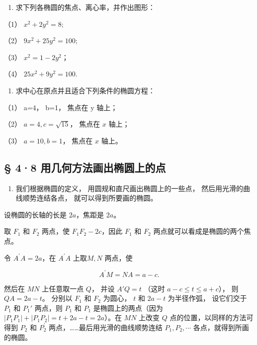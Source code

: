 \begin{enumerate}
\def\labelenumi{\arabic{enumi}.}
\tightlist
\item
  求下列各椭圆的焦点、离心率，并作出图形：
\end{enumerate}

（1） \(x^{2} + 2y^{2} = 8;\)

（2） \(9x^{2} + 25y^{2} = 100;\)

（3） \(x^{2} = 1 - 2y^{2}\)；

（4） \(25x^{2} + 9y^{2} = 100.\)

\begin{enumerate}
\def\labelenumi{\arabic{enumi}.}
\setcounter{enumi}{1}
\tightlist
\item
  求中心在原点并且适合下列条件的椭圆方程：
\end{enumerate}

（1） a=4， b=1， 焦点在 y 轴上；

（2） \(a = 4, c = \sqrt{15}\)， 焦点在 \(x\) 轴上；

（3） \(a = 10, b = 1\)， 焦点在 \(x\) 轴上。

\subsection{§ 4·8
用几何方法画出椭圆上的点}\label{ux7528ux51e0ux4f55ux65b9ux6cd5ux753bux51faux692dux5706ux4e0aux7684ux70b9}

\begin{enumerate}
\def\labelenumi{\arabic{enumi}.}
\tightlist
\item
  我们根据椭圆的定义， 用圆规和直尺画出椭圆上的一些点，
  然后用光滑的曲线顺势连结各点， 就可以得到所要画的椭圆。
\end{enumerate}

设椭圆的长轴的长是 \(2a\)，焦距是 \(2a\)。

取 \(F_{1}\) 和 \(F_{2}\) 两点，使 \(F_{1}F_{2} - 2c\)，因此 \(F_{1}\)
和 \(F_{2}\) 两点就可以看成是椭圆的两个焦点。

令 \(A^{\prime}A = 2a\)，在 \(A^{\prime}A\) 上取\(M,N\) 两点，使

\[
A^{\prime} M = NA = a - c.
\]

然后在 \(MN\) 上任意取一点 \(Q\)， 并设 \(A'Q = t\) （这时
\(a - c \leqslant t \leqslant a + c\)）， 则 \(QA = 2a - t\)。 分别以
\(F_1\) 和 \(F_2\) 为圆心， \(t\) 和 \(2a - t\) 为半径作弧， 设它们交于
\(P_1\) 和 \(P_1'\) 两点，则 \(P_{1}\) 和 \(P_{1}\) 是椭圆上的两点（因为
\(\left|P_{1}P_{1}\right| + \left|P_{1}P_{2}\right| = t + 2a - t = 2a\)）。在
\(MN\) 上改变 \(Q\) 点的位置，以同样的方法可得到 \(P_{2}\) 和
\(P_{2}^{\prime}\) 两点，\ldots\ldots 最后用光滑的曲线顺势连结
\(P_{1}, P_{2}, \cdots\) 各点，就得到所画的椭圆。

